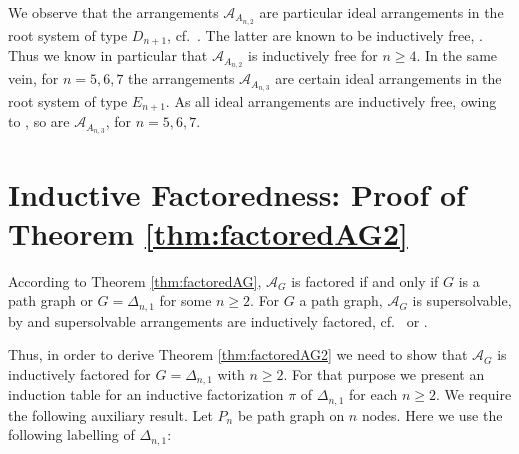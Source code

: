 \documentclass[12pt]{amsart}
\newcommand\CA{{\mathscr A}}
\numberwithin{equation}{section}
\theoremstyle{plain}
\theoremstyle{definition}
\begin{document}
We observe that the arrangements $\CA_{A_{n,2}}$ are particular ideal arrangements in the root system of type $D_{n+1}$, cf.~\cite[Ex.~1.4]{cuntzkuehne:subgraphs}. The latter
are known to be inductively free, \cite[Thm.~1.7]{roehrle:ideal}.
Thus we know in particular that $\CA_{A_{n,2}}$ is inductively free for $n \ge 4$.
In the same vein, for $n = 5,6,7$ the arrangements $\CA_{A_{n,3}}$ are certain ideal 
arrangements in the root system of type $E_{n+1}$.
As all ideal 
arrangements are inductively free, owing to \cite[Thm.~1.4]{cuntzroehrleschauenburg:ideal},
so are  $\CA_{A_{n,3}}$, for $n = 5,6,7$.


\section{Inductive Factoredness: Proof of Theorem \ref{thm:factoredAG2}}
\label{s:thm:factoredAG2}

According to Theorem \ref{thm:factoredAG},
$\CA_G$ is factored if and only if $G$ is a path graph or
$G =\Delta_{n,1}$ for some $n \ge 2$.
For $G$ a path graph, $\CA_G$ is supersolvable, by \cite[Cor.~8.11]{cuntzkuehne:subgraphs} and supersolvable arrangements are inductively factored, cf.~\cite{jambuparis:factored} or \cite[Prop.~3.11]{hogeroehrle:factored}.

Thus, in order to derive Theorem \ref{thm:factoredAG2} we need to show that $\CA_G$ is inductively factored for
$G =\Delta_{n,1}$ with $n \ge 2$.
For that purpose we present an induction table
for an inductive factorization $\pi$ of $\Delta_{n,1}$ for each $n \ge 2$. We require the following auxiliary result. Let $P_n$ be path graph on $n$ nodes.
Here we use the following labelling of $\Delta_{n,1}$:
\end{document}
